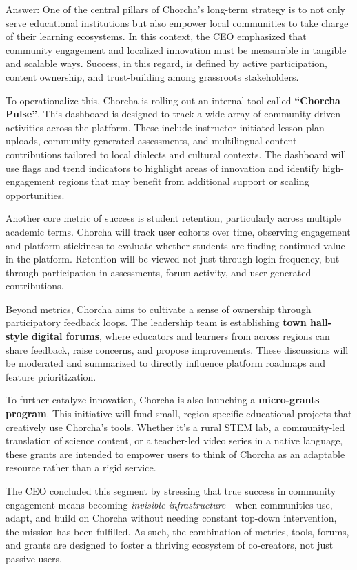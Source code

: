\documentclass[12pt,a4paper,oneside]{book}
\begin{document}
\begin{enumerate}
Answer: One of the central pillars of Chorcha’s long-term strategy is to not only serve educational institutions but also empower local communities to take charge of their learning ecosystems. In this context, the CEO emphasized that community engagement and localized innovation must be measurable in tangible and scalable ways. Success, in this regard, is defined by active participation, content ownership, and trust-building among grassroots stakeholders.

To operationalize this, Chorcha is rolling out an internal tool called \textbf{“Chorcha Pulse”}. This dashboard is designed to track a wide array of community-driven activities across the platform. These include instructor-initiated lesson plan uploads, community-generated assessments, and multilingual content contributions tailored to local dialects and cultural contexts. The dashboard will use flags and trend indicators to highlight areas of innovation and identify high-engagement regions that may benefit from additional support or scaling opportunities.

Another core metric of success is student retention, particularly across multiple academic terms. Chorcha will track user cohorts over time, observing engagement and platform stickiness to evaluate whether students are finding continued value in the platform. Retention will be viewed not just through login frequency, but through participation in assessments, forum activity, and user-generated contributions.

Beyond metrics, Chorcha aims to cultivate a sense of ownership through participatory feedback loops. The leadership team is establishing \textbf{town hall-style digital forums}, where educators and learners from across regions can share feedback, raise concerns, and propose improvements. These discussions will be moderated and summarized to directly influence platform roadmaps and feature prioritization.

To further catalyze innovation, Chorcha is also launching a \textbf{micro-grants program}. This initiative will fund small, region-specific educational projects that creatively use Chorcha’s tools. Whether it's a rural STEM lab, a community-led translation of science content, or a teacher-led video series in a native language, these grants are intended to empower users to think of Chorcha as an adaptable resource rather than a rigid service.

The CEO concluded this segment by stressing that true success in community engagement means becoming \emph{invisible infrastructure}—when communities use, adapt, and build on Chorcha without needing constant top-down intervention, the mission has been fulfilled. As such, the combination of metrics, tools, forums, and grants are designed to foster a thriving ecosystem of co-creators, not just passive users.



\end{enumerate}
\end{document}
